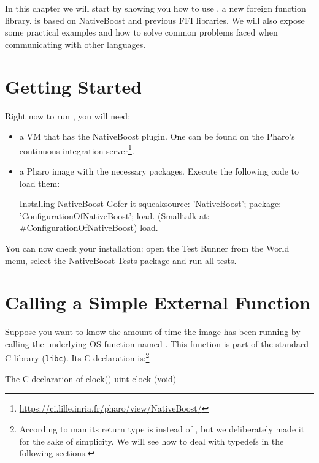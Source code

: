 \documentclass[a4paper,10pt,twoside]{book}
\begin{document}
In this chapter we will start by showing you how to use \NativeBoost, a new foreign function library. 
\NativeBoost is based on NativeBoost and previous FFI libraries.
We will also expose some practical examples and how to solve common problems faced when communicating with other languages.


\section{Getting Started}

Right now to run \NativeBoost, you will need:

\begin{itemize}
	\item  a VM that has the NativeBoost plugin. 
	One can be found on the Pharo's continuous integration server\footnote{\url{https://ci.lille.inria.fr/pharo/view/NativeBoost/}}.
	
	\item a Pharo image with the necessary packages. Execute the following code to load them:
	
	\begin{script}{Installing NativeBoost}
	Gofer it
	    squeaksource: 'NativeBoost';
	    package: 'ConfigurationOfNativeBoost';
	    load.
	(Smalltalk at: #ConfigurationOfNativeBoost) load.
	\end{script}
	
\end{itemize}

You can now check your installation: open the Test Runner from the World menu, select the NativeBoost-Tests package and run all tests.


\section{Calling a Simple External Function}

Suppose you want to know the amount of time the image has been running
by calling the underlying OS function named . This function
is part of the standard C library (\texttt{libc}). Its C declaration
is:\footnote{According to man its return type is  instead
  of , but we deliberately made it  for the sake of
  simplicity. We will see how to deal with typedefs in the following
  sections.}

\begin{script}{The C declaration of clock()}
uint clock (void)
\end{script}
\end{document}
